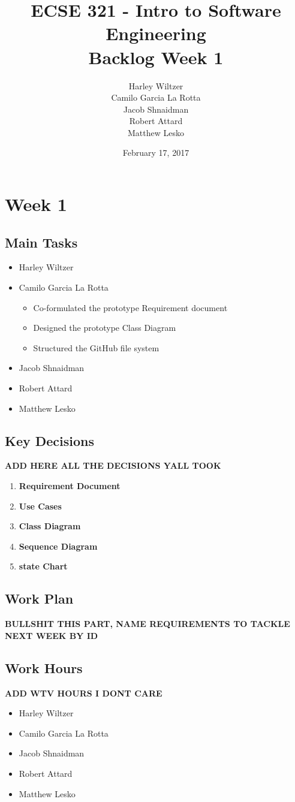 \documentclass[12pt]{article}
\title{ECSE 321 - Intro to Software Engineering\\Backlog Week 1}
\author{Harley Wiltzer\\Camilo Garcia La Rotta\\Jacob Shnaidman\\Robert Attard\\Matthew Lesko}
\date{February 17, 2017}
\begin{document}
\maketitle
\newpage
{} %

\section{Week 1}
\subsection{Main Tasks}
\begin{itemize}
    \item Harley Wiltzer
    \item Camilo Garcia La Rotta
    \begin{itemize}
        \item Co-formulated the prototype Requirement document
        \item Designed the prototype Class Diagram
        \item Structured the GitHub file system
    \end{itemize}
    \item Jacob Shnaidman
    \item Robert Attard
    \item Matthew Lesko
\end{itemize}

\subsection{Key Decisions}

\textbf{ADD HERE ALL THE DECISIONS YALL TOOK}

\begin{enumerate}
    \item \textbf{Requirement Document}
    \item \textbf{Use Cases}
    \item \textbf{Class Diagram}
    \item \textbf{Sequence Diagram}
    \item \textbf{state Chart}
\end{enumerate}

\subsection{Work Plan}

\textbf{BULLSHIT THIS PART, NAME REQUIREMENTS TO TACKLE NEXT WEEK BY ID}

\subsection{Work Hours}
\textbf{ADD WTV HOURS I DONT CARE}
\begin{itemize}
    \item Harley Wiltzer
    \item Camilo Garcia La Rotta
    \item Jacob Shnaidman
    \item Robert Attard
    \item Matthew Lesko
\end{itemize}
\end{document}
